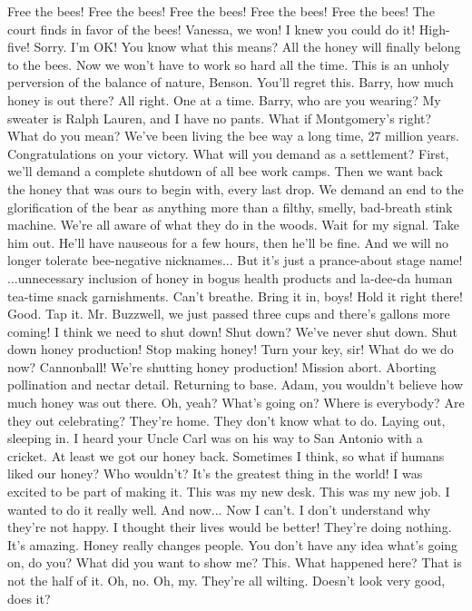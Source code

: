 \documentclass[a4paper,12pt]{article}
\begin{document}
Free the bees! Free the bees! Free the bees! Free the bees! Free the bees!
The court finds in favor of the bees!
Vanessa, we won!
I knew you could do it! High-five!
Sorry.
I'm OK! You know what this means?
All the honey will finally belong to the bees.
Now we won't have to work so hard all the time.
This is an unholy perversion of the balance of nature, Benson.
You'll regret this.
Barry, how much honey is out there?
All right. One at a time.
Barry, who are you wearing?
My sweater is Ralph Lauren, and I have no pants.
What if Montgomery's right?
What do you mean?
We've been living the bee way a long time, 27 million years.
Congratulations on your victory. What will you demand as a settlement?
First, we'll demand a complete shutdown of all bee work camps.
Then we want back the honey that was ours to begin with, every last drop.
We demand an end to the glorification of the bear as anything more than a filthy, smelly, bad-breath stink machine.
We're all aware of what they do in the woods.
Wait for my signal. Take him out.
He'll have nauseous for a few hours, then he'll be fine.
And we will no longer tolerate bee-negative nicknames...
But it's just a prance-about stage name!
...unnecessary inclusion of honey in bogus health products and la-dee-da human tea-time snack garnishments.
Can't breathe.
Bring it in, boys!
Hold it right there! Good.
Tap it.
Mr. Buzzwell, we just passed three cups and there's gallons more coming!
I think we need to shut down!
Shut down? We've never shut down.
Shut down honey production!
Stop making honey!
Turn your key, sir!
What do we do now?
Cannonball!
We're shutting honey production!
Mission abort.
Aborting pollination and nectar detail.
Returning to base.
Adam, you wouldn't believe how much honey was out there.
Oh, yeah?
What's going on? Where is everybody?
Are they out celebrating?
They're home.
They don't know what to do. Laying out, sleeping in.
I heard your Uncle Carl was on his way to San Antonio with a cricket.
At least we got our honey back.
Sometimes I think, so what if humans liked our honey? Who wouldn't?
It's the greatest thing in the world! I was excited to be part of making it.
This was my new desk. This was my new job. I wanted to do it really well. And now...
Now I can't.
I don't understand why they're not happy.
I thought their lives would be better!
They're doing nothing. It's amazing.
Honey really changes people.
You don't have any idea what's going on, do you?
What did you want to show me?
This.
What happened here?
That is not the half of it.
Oh, no. Oh, my.
They're all wilting.
Doesn't look very good, does it?
\end{document}
